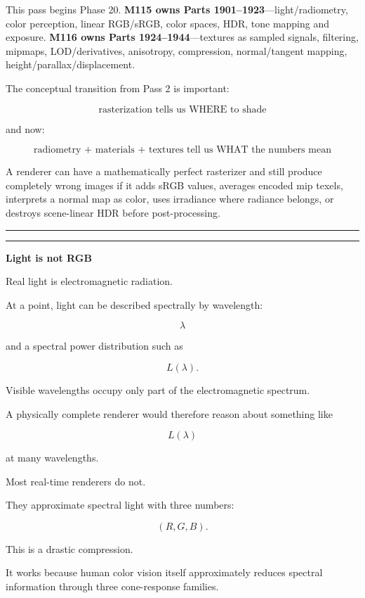 This pass begins Phase 20. \textbf{M115 owns Parts 1901--1923}---light/radiometry, color perception, linear RGB/sRGB, color spaces, HDR, tone mapping and exposure. \textbf{M116 owns Parts 1924--1944}---textures as sampled signals, filtering, mipmaps, LOD/derivatives, anisotropy, compression, normal/tangent mapping, height/parallax/displacement.

The conceptual transition from Pass 2 is important:

\[
\text{rasterization tells us WHERE to shade}
\]

and now:

\[
\boxed{\text{radiometry + materials + textures tell us WHAT the numbers mean}}
\]

A renderer can have a mathematically perfect rasterizer and still produce completely wrong images if it adds sRGB values, averages encoded mip texels, interprets a normal map as color, uses irradiance where radiance belongs, or destroys scene-linear HDR before post-processing.

\begin{center}\rule{0.5\linewidth}{0.5pt}\end{center}

\begin{center}\rule{0.5\linewidth}{0.5pt}\end{center}

\textbf{Light is not RGB}

Real light is electromagnetic radiation.

At a point, light can be described spectrally by wavelength:

\[
\lambda
\]

and a spectral power distribution such as

\[
L(\lambda).
\]

Visible wavelengths occupy only part of the electromagnetic spectrum.

A physically complete renderer would therefore reason about something like

\[
L(\lambda)
\]

at many wavelengths.

Most real-time renderers do not.

They approximate spectral light with three numbers:

\[
(R,G,B).
\]

This is a drastic compression.

It works because human color vision itself approximately reduces spectral information through three cone-response families.

